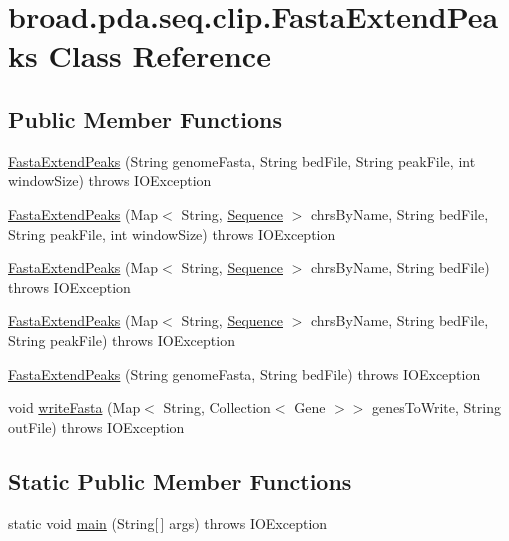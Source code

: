 \hypertarget{classbroad_1_1pda_1_1seq_1_1clip_1_1_fasta_extend_peaks}{\section{broad.\+pda.\+seq.\+clip.\+Fasta\+Extend\+Peaks Class Reference}
\label{classbroad_1_1pda_1_1seq_1_1clip_1_1_fasta_extend_peaks}
}
\subsection*{Public Member Functions}
\begin{DoxyCompactItemize}
\item 
\hyperlink{classbroad_1_1pda_1_1seq_1_1clip_1_1_fasta_extend_peaks_a922437e3b4165f1293d967e46e5741a4}{Fasta\+Extend\+Peaks} (String genome\+Fasta, String bed\+File, String peak\+File, int window\+Size)  throws I\+O\+Exception 
\item 
\hyperlink{classbroad_1_1pda_1_1seq_1_1clip_1_1_fasta_extend_peaks_aae7bf375a55cb17affc360324815a142}{Fasta\+Extend\+Peaks} (Map$<$ String, \hyperlink{classbroad_1_1core_1_1sequence_1_1_sequence}{Sequence} $>$ chrs\+By\+Name, String bed\+File, String peak\+File, int window\+Size)  throws I\+O\+Exception 
\item 
\hyperlink{classbroad_1_1pda_1_1seq_1_1clip_1_1_fasta_extend_peaks_ab9aa96428d0e1090006727b998a4b962}{Fasta\+Extend\+Peaks} (Map$<$ String, \hyperlink{classbroad_1_1core_1_1sequence_1_1_sequence}{Sequence} $>$ chrs\+By\+Name, String bed\+File)  throws I\+O\+Exception 
\item 
\hyperlink{classbroad_1_1pda_1_1seq_1_1clip_1_1_fasta_extend_peaks_aa181acccf89f5030e61b519f8d6e3d5f}{Fasta\+Extend\+Peaks} (Map$<$ String, \hyperlink{classbroad_1_1core_1_1sequence_1_1_sequence}{Sequence} $>$ chrs\+By\+Name, String bed\+File, String peak\+File)  throws I\+O\+Exception 
\item 
\hyperlink{classbroad_1_1pda_1_1seq_1_1clip_1_1_fasta_extend_peaks_a19906aeb3599308e7c6e27939221f722}{Fasta\+Extend\+Peaks} (String genome\+Fasta, String bed\+File)  throws I\+O\+Exception 
\item 
void \hyperlink{classbroad_1_1pda_1_1seq_1_1clip_1_1_fasta_extend_peaks_a5825a0c102ca5dc3a2668073f8e490e7}{write\+Fasta} (Map$<$ String, Collection$<$ Gene $>$$>$ genes\+To\+Write, String out\+File)  throws I\+O\+Exception 
\end{DoxyCompactItemize}
\subsection*{Static Public Member Functions}
\begin{DoxyCompactItemize}
\item 
static void \hyperlink{classbroad_1_1pda_1_1seq_1_1clip_1_1_fasta_extend_peaks_a254578bf9ef7cc16e998aac6e8e41650}{main} (String\mbox{[}$\,$\mbox{]} args)  throws I\+O\+Exception 
\end{DoxyCompactItemize}


